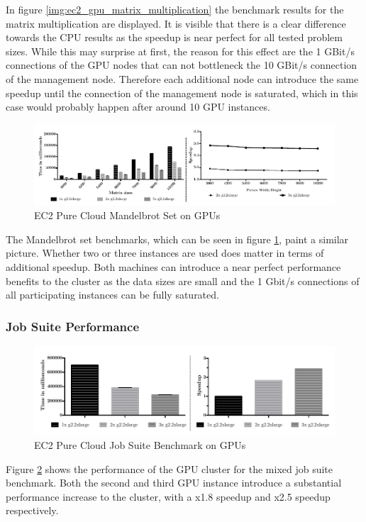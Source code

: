 In figure \ref{img:ec2_gpu_matrix_multiplication} the benchmark results for the matrix multiplication are displayed. It is visible that there is a clear difference towards the CPU results as the speedup is near perfect for all tested problem sizes. While this may surprise at first, the reason for this effect are the 1 GBit/s connections of the GPU nodes that can not bottleneck the 10 GBit/s connection of the management node. Therefore each additional node can introduce the same speedup until the connection of the management node is saturated, which in this case would probably happen after around 10 GPU instances.

\begin{figure}[H]	
	\includegraphics[width=1.0\textwidth]{images/ec2_gpu_mandelbrot.pdf}
	\centering
	\caption{EC2 Pure Cloud Mandelbrot Set on GPUs}
	\label{img:ec2_gpu_mandelbrot}
\end{figure}

The Mandelbrot set benchmarks, which can be seen in figure \ref{img:ec2_gpu_mandelbrot}, paint a similar picture. Whether two or three instances are used does matter in terms of additional speedup. Both machines can introduce a near perfect performance benefits to the cluster as the data sizes are small and the 1 Gbit/s connections of all participating instances can be fully saturated.

\subsubsection*{Job Suite Performance}

\begin{figure}[H]	
	\includegraphics[width=1.0\textwidth]{images/ec2_gpu_full_benchmark.pdf}
	\centering
	\caption{EC2 Pure Cloud Job Suite Benchmark on GPUs}
	\label{img:ec2_gpu_full_benchmark}
\end{figure}

Figure \ref{img:ec2_gpu_full_benchmark} shows the performance of the GPU cluster for the mixed job suite benchmark. Both the second and third GPU instance introduce a substantial performance increase to the cluster, with a x1.8 speedup and x2.5 speedup respectively.
